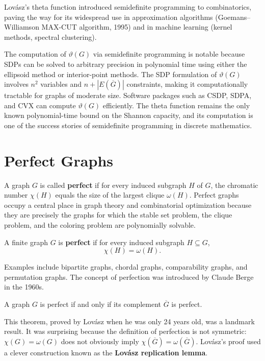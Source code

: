Lov\'{a}sz's theta function introduced semidefinite programming to combinatorics, paving the way for its widespread use in approximation algorithms (Goemans--Williamson MAX-CUT algorithm, 1995) and in machine learning (kernel methods, spectral clustering).

The computation of \(\vartheta(G)\) via semidefinite programming is notable because SDPs can be solved to arbitrary precision in polynomial time using either the ellipsoid method or interior-point methods. The SDP formulation of \(\vartheta(G)\) involves \(n^2\) variables and \(n + |E(\overline{G})|\) constraints, making it computationally tractable for graphs of moderate size. Software packages such as CSDP, SDPA, and CVX can compute \(\vartheta(G)\) efficiently. The theta function remains the only known polynomial-time bound on the Shannon capacity, and its computation is one of the success stories of semidefinite programming in discrete mathematics.

\section{Perfect Graphs}

A graph \(G\) is called \textbf{perfect} if for every induced subgraph \(H\) of \(G\), the chromatic number \(\chi(H)\) equals the size of the largest clique \(\omega(H)\). Perfect graphs occupy a central place in graph theory and combinatorial optimization because they are precisely the graphs for which the stable set problem, the clique problem, and the coloring problem are polynomially solvable.

\begin{definition}
A finite graph \(G\) is \textbf{perfect} if for every induced subgraph \(H \subseteq G\),
\[
\chi(H) = \omega(H).
\]
\end{definition}

Examples include bipartite graphs, chordal graphs, comparability graphs, and permutation graphs. The concept of perfection was introduced by Claude Berge in the 1960s.

\begin{theorem}
A graph \(G\) is perfect if and only if its complement \(\overline{G}\) is perfect.
\end{theorem}

This theorem, proved by Lov\'{a}sz when he was only 24 years old, was a landmark result. It was surprising because the definition of perfection is not symmetric: \(\chi(G) = \omega(G)\) does not obviously imply \(\chi(\overline{G}) = \omega(\overline{G})\). Lov\'{a}sz's proof used a clever construction known as the \textbf{Lov\'{a}sz replication lemma}.

